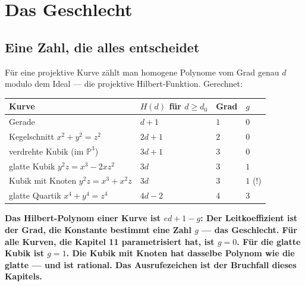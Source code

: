 \chapter{Das Geschlecht}

\section{Eine Zahl, die alles entscheidet}

\begin{merksatz}
Für eine projektive Kurve zählt man homogene Polynome vom Grad genau $d$ modulo dem Ideal --- die projektive Hilbert-Funktion. Gerechnet:

\begin{center}
{\small
\renewcommand{\arraystretch}{1.46}
\begin{tabular}{@{}P{3.4cm}P{2.6cm}P{1.0cm}P{1.4cm}@{}}
\toprule
\textbf{Kurve} & $H(d)$ für $d\ge d_0$ & \textbf{Grad} & $g$\\
\midrule
Gerade & $d + 1$ & $1$ & $0$\\
Kegelschnitt $x^{2} + y^{2} = z^{2}$ & $2d + 1$ & $2$ & $0$\\
verdrehte Kubik (im $\mathbb P^{3}$) & $3d + 1$ & $3$ & $0$\\
glatte Kubik $y^{2}z = x^{3} - 2xz^{2}$ & $3d$ & $3$ & $1$\\
Kubik mit Knoten $y^{2}z = x^{3} + x^{2}z$ & $3d$ & $3$ & $1$ (!)\\
glatte Quartik $x^{4} + y^{4} = z^{4}$ & $4d - 2$ & $4$ & $3$\\
\bottomrule
\end{tabular}}
\end{center}

\begin{center}
\begin{minipage}{0.9\textwidth}
\textbf{Das Hilbert-Polynom einer Kurve ist $ed + 1 - g$: Der Leitkoeffizient ist der Grad, die Konstante bestimmt eine Zahl $g$ --- das Geschlecht. Für alle Kurven, die Kapitel 11 parametrisiert hat, ist $g = 0$. Für die glatte Kubik ist $g = 1$. Die Kubik mit Knoten hat dasselbe Polynom wie die glatte --- und ist rational. Das Ausrufezeichen ist der Bruchfall dieses Kapitels.}
\end{minipage}
\end{center}


\end{merksatz}
